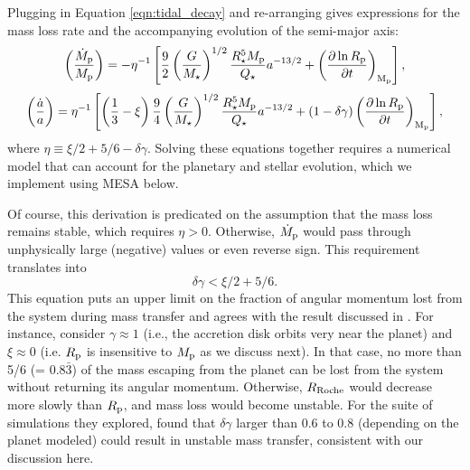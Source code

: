 \documentclass{svjour3}                     %
\begin{document}
Plugging in Equation \ref{eqn:tidal_decay} and re-arranging gives expressions for the mass loss rate and the accompanying evolution of the semi-major axis:
\begin{equation}
\left( \frac{\dot{M}_{\rm p}}{M_{\rm p}} \right) = -\eta^{-1} \left[ \frac{9}{2} \left( \frac{G}{M_{\star}} \right)^{1/2} \frac{R_{\star}^5 M_{\rm p}}{Q_{\star}} a^{-13/2} + \left( \frac{\partial \ln R_{\rm p}}{\partial t} \right)_{\rm M_{\rm p}} \right],
\label{eqn:RLO_mass_loss_rate}
\end{equation}
\begin{equation}
\left( \frac{\dot{a}}{a} \right) = \eta^{-1} \left[\left( \frac{1}{3} - \xi \right) \frac{9}{4} \left( \frac{G}{M_{\star}} \right)^{1/2} \frac{R_{\star}^5 M_{\rm p}}{Q_{\star}} a^{-13/2} + \left( 1 - \delta \gamma \right) \left( \frac{\partial \ln R_{\rm p}}{\partial t} \right)_{\rm M_{\rm p}} \right],
\label{eqn:a_evolution_rate}
\end{equation}
where $\eta \equiv \xi/2 + 5/6 - \delta \gamma$. 
Solving these equations together requires a numerical model that can account for the planetary and stellar evolution, which we implement using MESA below. 

Of course, this derivation is predicated on the assumption that the mass loss remains stable, which requires $\eta > 0$. Otherwise, $\dot{M}_{\rm p}$ would pass through unphysically large (negative) values or even reverse sign. This requirement translates into
\begin{equation}
\delta \gamma < \xi/2 + 5/6.
\label{eqn:stability_condition}
\end{equation}
This equation puts an upper limit on the fraction of angular momentum lost from the system during mass transfer and agrees with the result discussed in \cite{2015ApJ...813..101V}. For instance, consider $\gamma \approx 1$ (i.e., the accretion disk orbits very near the planet) and $\xi \approx 0$ (i.e. $R_{\rm p}$ is insensitive to $M_{\rm p}$ as we discuss next). In that case, no more than 5/6 (= $0.8\bar{3}$) of the mass escaping from the planet can be lost from the system without returning its angular momentum. Otherwise, $R_{\rm Roche}$ would decrease more slowly than $R_{\rm p}$, and mass loss would become unstable. For the suite of simulations they explored, \cite{2015ApJ...813..101V} found that $\delta \gamma$ larger than 0.6 to 0.8 (depending on the planet modeled) could result in unstable mass transfer, consistent with our discussion here. 
\end{document}
